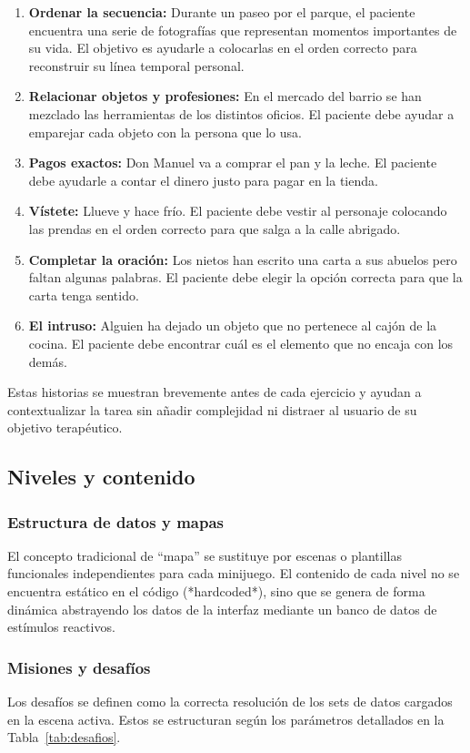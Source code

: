 \begin{enumerate}
    \item \textbf{Ordenar la secuencia:} Durante un paseo por el parque, el paciente encuentra una serie de fotografías que representan momentos importantes de su vida. El objetivo es ayudarle a colocarlas en el orden correcto para reconstruir su línea temporal personal.
    \item \textbf{Relacionar objetos y profesiones:} En el mercado del barrio se han mezclado las herramientas de los distintos oficios. El paciente debe ayudar a emparejar cada objeto con la persona que lo usa.
    \item \textbf{Pagos exactos:} Don Manuel va a comprar el pan y la leche. El paciente debe ayudarle a contar el dinero justo para pagar en la tienda.
    \item \textbf{Vístete:} Llueve y hace frío. El paciente debe vestir al personaje colocando las prendas en el orden correcto para que salga a la calle abrigado.
    \item \textbf{Completar la oración:} Los nietos han escrito una carta a sus abuelos pero faltan algunas palabras. El paciente debe elegir la opción correcta para que la carta tenga sentido.
    \item \textbf{El intruso:} Alguien ha dejado un objeto que no pertenece al cajón de la cocina. El paciente debe encontrar cuál es el elemento que no encaja con los demás.
\end{enumerate}

Estas historias se muestran brevemente antes de cada ejercicio y ayudan a contextualizar la tarea sin añadir complejidad ni distraer al usuario de su objetivo terapéutico.

\subsection{Niveles y contenido}

\subsubsection{Estructura de datos y mapas}
El concepto tradicional de ``mapa'' se sustituye por escenas o plantillas funcionales independientes para cada minijuego. El contenido de cada nivel no se encuentra estático en el código (*hardcoded*), sino que se genera de forma dinámica abstrayendo los datos de la interfaz mediante un banco de datos de estímulos reactivos.

\subsubsection{Misiones y desafíos}
Los desafíos se definen como la correcta resolución de los sets de datos cargados en la escena activa. Estos se estructuran según los parámetros detallados en la Tabla~\ref{tab:desafios}.

